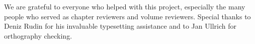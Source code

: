 
We are grateful to everyone who helped with this project, especially the many people who served as chapter reviewers and volume reviewers. Special thanks to Deniz Rudin for his invaluable typesetting assistance and to Jan Ullrich for orthography checking. 
  

